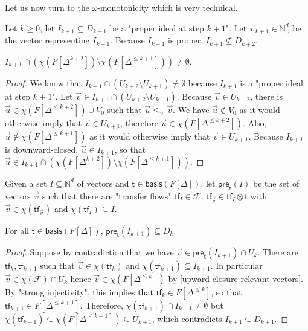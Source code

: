 \documentclass[10pt,a4paper]{article}
\let\mathbb\mathds
\renewcommand{\geq}{\geqslant}
\renewcommand{\leq}{\leqslant}
\newcommand{\nats}{\mathbb{N}}
\newcommand{\preop}{\mathsf{pre}}
\newcommand{\transitions}{\Delta}
\newcommand*{\transferflows}{\mathcal{F}}
\newcommand*{\minwqo}[1]{\mathsf{basis}(#1)}
\newcommand*{\transfersof}[1]{F[#1]}
\newcommand*{\atf}{\mathsf{tf}}
\newcommand*{\tftimes}{\otimes}
\newcommand*{\omeganats}{\nats_{\omega}}
\newcommand*{\preflows}[2]{\preop_{#1}(#2)}
\newcommand*{\zerovectors}{V_0}
\newcommand{\Tleq}[1]{\transfersof{\transitions^{\leq #1}}}
\newcommand{\Tpow}[1]{\transfersof{\transitions^{#1}}}
\newcommand{\T}{\transfersof{\transitions}}
\newcommand*{\leprod}{\leq_{\times}}
\newcommand*{\mapencoding}{\chi}
\newcommand*{\relevantvectors}{\mapencoding(\transferflows)}
\newcommand*{\tftrans}{\mathsf{t}}
\newcommand*{\Tmin}{\minwqo{\T}}
\begin{document}
\begin{appendixproof}
	Let us now turn to the \(\omega\)-monotonicity which is very technical.

	Let \(k \geq 0\), let \(I_{k+1} \subseteq D_{k+1}\) be a "proper ideal at step \(k+1\)".
	Let \(\vec{v}_{k+1} \in \omeganats^d\) be the vector representing \(I_{k+1}\).
	Because \(I_{k+1}\) is proper, \(I_{k+1} \nsubseteq D_{k+2}\).

	\begin{lemma}
		\label{ikplisone-intersects}
		\(I_{k+1} \cap (\mapencoding(\Tpow{k+2}) \setminus \mapencoding(\Tleq{k+1})) \ne \emptyset\).
	\end{lemma}
	\begin{proof}
		We know that \(I_{k+1} \cap (U_{k+2} \setminus U_{k+1}) \ne \emptyset\) because \(I_{k+1}\) is a "proper ideal at step \(k+1\)".
		Let \(\vec{v} \in I_{k+1} \cap (U_{k+2} \setminus U_{k+1})\).
		Because \(\vec{v} \in U_{k+2}\), there is \(\vec{u} \in \mapencoding(\Tleq{k+2}) \cup \zerovectors\) such that \(\vec{u} \leprod \vec{v}\).
		We have \(\vec{u} \notin \zerovectors\) as it would otherwise imply that \(\vec{v} \in U_{k+1}\), therefore \(\vec{u} \in \mapencoding(\Tleq{k+2})\).
		Also, \(\vec{u} \notin \mapencoding(\Tleq{k+1})\) as it would otherwise imply that \(\vec{v} \in U_{k+1}\).
		Because \(I_{k+1}\) is downward-closed, \(\vec{u} \in I_{k+1}\), so that \(\vec{u} \in I_{k+1} \cap (\mapencoding(\Tpow{k+2}) \setminus \mapencoding(\Tleq{k+1}))\).
	\end{proof}

	Given a set \(I \subseteq \nats^d\) of vectors and \(\tftrans \in \Tmin\), let \(\preflows{\tftrans}{I}\) be the set of vectors \(\vec{v}\) such that there are "transfer flows" \(\atf_{I} \in \transferflows\), \(\atf_{\vec{v}} \in \atf_I \tftimes \tftrans \) with \(\vec{v} \in \mapencoding(\atf_{\vec{v}})\) and \(\mapencoding(\atf_I) \subseteq I\).

	\begin{lemma}
		For all \(\tftrans \in \Tmin\), \(\preflows{\tftrans}{I_{k+1}} \subseteq D_k\).
	\end{lemma}
	\begin{proof}
		Suppose by contradiction that we have \(\vec{v} \in \preflows{\tftrans}{I_{k+1}} \cap U_k\).
		There are \(\atf_{k}, \atf_{k+1}\) such that \(\vec{v} \in \mapencoding(\atf_k)\) and \(\mapencoding(\atf_{k+1}) \subseteq I_{k+1}\).
		In particular \(\vec{v} \in \relevantvectors \cap U_k\) hence \(\vec{v} \in \mapencoding(\Tleq{k})\) by \cref{upward-closure-relevant-vectors}.
		By "strong injectivity", this implies that \(\atf_k \in \Tleq{k}\), so that \(\atf_{k+1} \in \Tleq{k+1}\).
		Therefore, \(\mapencoding(\atf_{k+1}) \cap I_{k+1} \ne \emptyset\) but \(\mapencoding(\atf_{k+1}) \subseteq \mapencoding(\Tleq{k+1}) \subseteq U_{k+1}\), which contradicts \(I_{k+1} \subseteq D_{k+1}\).
	\end{proof}


\end{appendixproof}
\end{document}

